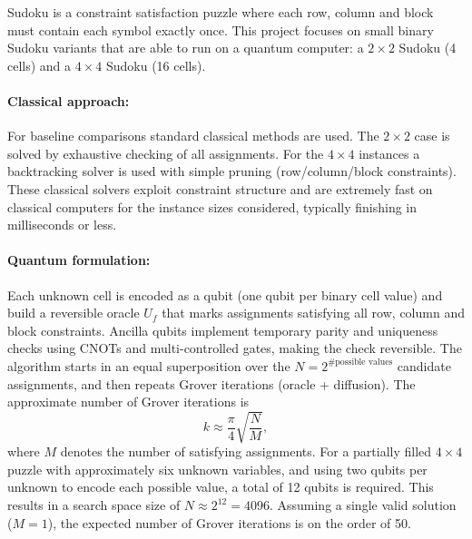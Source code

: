 
Sudoku is a constraint satisfaction puzzle where each row, column and block must contain each symbol exactly once. This project focuses on small binary Sudoku variants that are able to run on a quantum computer: a $2\times 2$ Sudoku (4 cells) and a $4\times 4$ Sudoku (16 cells). 


\paragraph{Classical approach:}
For baseline comparisons standard classical methods are used. The $2\times 2$ case is solved by exhaustive checking of all assignments. For the $4\times 4$ instances a backtracking solver is used with simple pruning (row/column/block constraints). These classical solvers exploit constraint structure and are extremely fast on classical computers for the instance sizes considered, typically finishing in milliseconds or less.

\paragraph{Quantum formulation:}
Each unknown cell is encoded as a qubit (one qubit per binary cell value) and build a reversible oracle \(U_f\) that marks assignments satisfying all row, column and block constraints. Ancilla qubits implement temporary parity and uniqueness checks using CNOTs and multi-controlled gates, making the check reversible. The algorithm starts in an equal superposition over the $N=2^{\#\text{possible values}}$ candidate assignments, and then repeats Grover iterations (oracle + diffusion). The approximate number of Grover iterations is
\[
k \approx \frac{\pi}{4}\sqrt{\frac{N}{M}},
\]
where \(M\) denotes the number of satisfying assignments. For a partially filled \(4 \times 4\) puzzle with approximately six unknown variables, and using two qubits per unknown to encode each possible value, a total of 12 qubits is required. This results in a search space size of \(N \approx 2^{12} = 4096\). Assuming a single valid solution (\(M = 1\)), the expected number of Grover iterations is on the order of 50.


